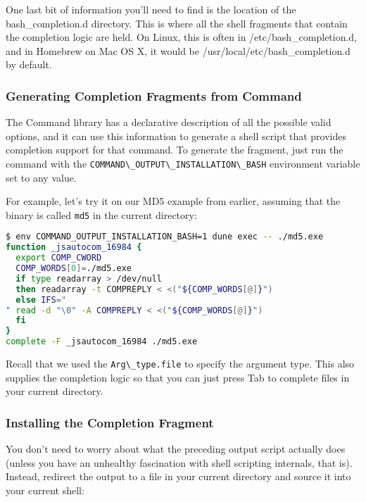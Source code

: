 One last bit of information you'll need to find is the location of the
bash\_completion.d directory. This is where all the shell fragments that
contain the completion logic are held. On Linux, this is often in
/etc/bash\_completion.d, and in Homebrew on Mac OS X, it would be
/usr/local/etc/bash\_completion.d by default.

\hypertarget{generating-completion-fragments-from-command}{%
\subsubsection{Generating Completion Fragments from
Command}\label{generating-completion-fragments-from-command}}

The Command library has a declarative description of all the possible
valid options, and it can use this information to generate a shell
script that provides completion support for that command. To generate
the fragment, just run the command with the
\passthrough{\lstinline!COMMAND\_OUTPUT\_INSTALLATION\_BASH!}
environment variable set to any value.

For example, let's try it on our MD5 example from earlier, assuming that
the binary is called \passthrough{\lstinline!md5!} in the current
directory:

\begin{lstlisting}[language=bash]
$ env COMMAND_OUTPUT_INSTALLATION_BASH=1 dune exec -- ./md5.exe
function _jsautocom_16984 {
  export COMP_CWORD
  COMP_WORDS[0]=./md5.exe
  if type readarray > /dev/null
  then readarray -t COMPREPLY < <("${COMP_WORDS[@]}")
  else IFS="
" read -d "\0" -A COMPREPLY < <("${COMP_WORDS[@]}")
  fi
}
complete -F _jsautocom_16984 ./md5.exe
\end{lstlisting}

Recall that we used the \passthrough{\lstinline!Arg\_type.file!} to
specify the argument type. This also supplies the completion logic so
that you can just press Tab to complete files in your current directory.

\hypertarget{installing-the-completion-fragment}{%
\subsubsection{Installing the Completion
Fragment}\label{installing-the-completion-fragment}}

You don't need to worry about what the preceding output script actually
does (unless you have an unhealthy fascination with shell scripting
internals, that is). Instead, redirect the output to a file in your
current directory and source it into your current shell:

